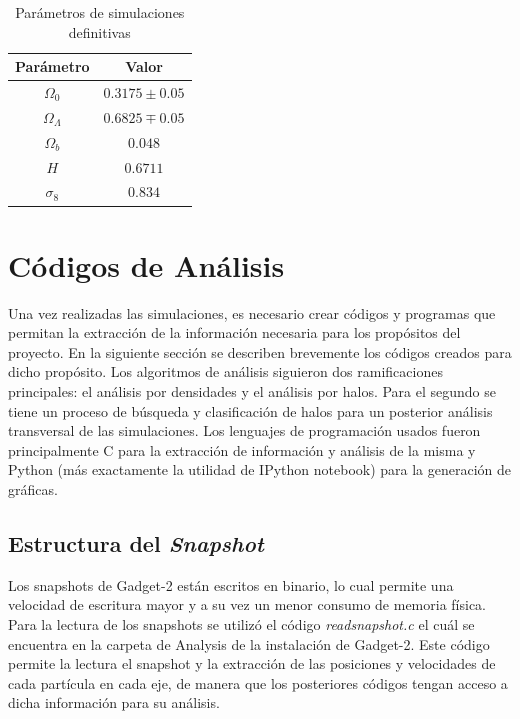 \begin{table}[H]
	\centering
	\begin{tabular}{cc}
		\hline \hline
		\textbf{Parámetro} & \textbf{Valor} 		\\
		\hline
		$\Omega_0$ 			& $0.3175\pm0.05$ 	\\
		$\Omega_\Lambda$ 	& $0.6825 \mp 0.05$	\\
		$\Omega_b$ 			& $0.048$			\\
		$H$					& $0.6711$			\\
		$\sigma_8$			& $0.834$			\\
		\hline
	\end{tabular}
	\caption{Parámetros de simulaciones definitivas}
	\label{tab:param}
\end{table}

\section{Códigos de Análisis}
Una vez realizadas las simulaciones, es necesario crear códigos y programas que permitan la extracción de la información necesaria para los propósitos del proyecto. En la siguiente sección se describen brevemente los códigos creados para dicho propósito. Los algoritmos de análisis siguieron dos ramificaciones principales: el análisis por densidades y el análisis por halos. Para el segundo se tiene un proceso de búsqueda y clasificación de halos para un posterior análisis transversal de las simulaciones. Los lenguajes de programación usados fueron principalmente C para la extracción de información y análisis de la misma y Python (más exactamente la utilidad de IPython notebook) para la generación de gráficas.
\subsection{Estructura del \textit{Snapshot}}
\label{sub:snap}
Los snapshots de Gadget-2 están escritos en binario, lo cual permite una velocidad de escritura mayor y a su vez un menor consumo de memoria física. Para la lectura de los snapshots se utilizó el código \textit{read\underline{\hspace{.1in}}snapshot.c} el cuál se encuentra en la carpeta de Analysis de la instalación de Gadget-2. Este código permite la lectura el snapshot y la extracción de las posiciones y velocidades de cada partícula en cada eje, de manera que los posteriores códigos tengan acceso a dicha información para su análisis. 

